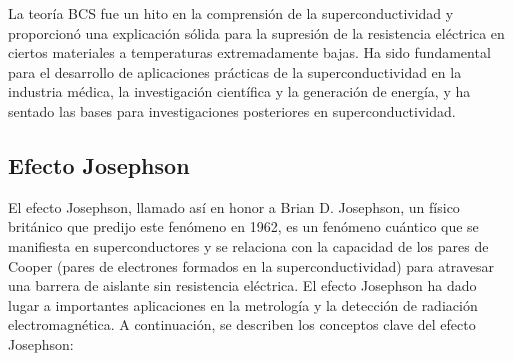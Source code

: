 \documentclass[10.5pt]{article}
\begin{document}
    La teoría BCS fue un hito en la comprensión de la superconductividad y proporcionó una explicación sólida para la supresión de la resistencia eléctrica en ciertos materiales a temperaturas extremadamente bajas. Ha sido fundamental para el desarrollo de aplicaciones prácticas de la superconductividad en la industria médica, la investigación científica y la generación de energía, y ha sentado las bases para investigaciones posteriores en superconductividad.
    \subsection{Efecto Josephson}
    El efecto Josephson, llamado así en honor a Brian D. Josephson, un físico británico que predijo este fenómeno en 1962, es un fenómeno cuántico que se manifiesta en superconductores y se relaciona con la capacidad de los pares de Cooper (pares de electrones formados en la superconductividad) para atravesar una barrera de aislante sin resistencia eléctrica. El efecto Josephson ha dado lugar a importantes aplicaciones en la metrología y la detección de radiación electromagnética. A continuación, se describen los conceptos clave del efecto Josephson:
\end{document}
